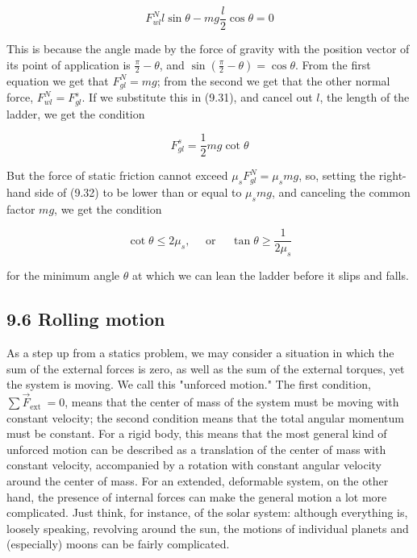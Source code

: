 \documentclass[10pt]{article}
\begin{document}
\begin{equation*}
F_{w l}^{N} l \sin \theta-m g \frac{l}{2} \cos \theta=0 \tag{9.31}
\end{equation*}


This is because the angle made by the force of gravity with the position vector of its point of application is $\frac{\pi}{2}-\theta$, and $\sin \left(\frac{\pi}{2}-\theta\right)=\cos \theta$. From the first equation we get that $F_{g l}^{N}=m g$; from the second we get that the other normal force, $F_{w l}^{N}=F_{g l}^{s}$. If we substitute this in (9.31), and cancel out $l$, the length of the ladder, we get the condition


\begin{equation*}
F_{g l}^{s}=\frac{1}{2} m g \cot \theta \tag{9.32}
\end{equation*}


But the force of static friction cannot exceed $\mu_{s} F_{g l}^{N}=\mu_{s} m g$, so, setting the right-hand side of (9.32) to be lower than or equal to $\mu_{s} m g$, and canceling the common factor $m g$, we get the condition


\begin{equation*}
\cot \theta \leq 2 \mu_{s}, \quad \text { or } \quad \tan \theta \geq \frac{1}{2 \mu_{s}} \tag{9.33}
\end{equation*}


for the minimum angle $\theta$ at which we can lean the ladder before it slips and falls.

\subsection*{9.6 Rolling motion}
As a step up from a statics problem, we may consider a situation in which the sum of the external forces is zero, as well as the sum of the external torques, yet the system is moving. We call this "unforced motion." The first condition, $\sum \vec{F}_{\text {ext }}=0$, means that the center of mass of the system must be moving with constant velocity; the second condition means that the total angular momentum must be constant. For a rigid body, this means that the most general kind of unforced motion can be described as a translation of the center of mass with constant velocity, accompanied by a rotation with constant angular velocity around the center of mass. For an extended, deformable system, on the other hand, the presence of internal forces can make the general motion a lot more complicated. Just think, for instance, of the solar system: although everything is, loosely speaking, revolving around the sun, the motions of individual planets and (especially) moons can be fairly complicated.
\end{document}
